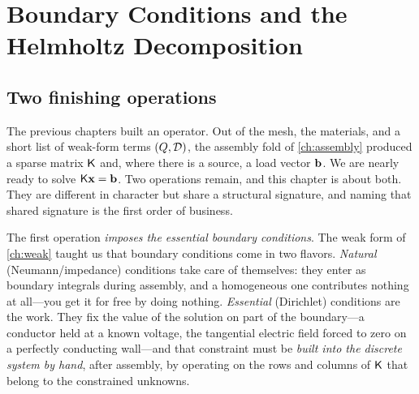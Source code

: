 \chapter{Boundary Conditions and the Helmholtz Decomposition}
\label{ch:bc}


\section{Two finishing operations}

The previous chapters built an operator. Out of the mesh, the materials, and a
short list of weak-form terms $(Q,\mathcal{D})$, the assembly fold of
\cref{ch:assembly} produced a sparse matrix $\mathsf{K}$ and, where there is a
source, a load vector $\mathbf{b}$. We are nearly ready to solve $\mathsf{K}\mathbf{x}=\mathbf{b}$. Two
operations remain, and this chapter is about both. They are different in
character but share a structural signature, and naming that shared signature is
the first order of business.

The first operation \emph{imposes the essential boundary conditions}. The weak
form of \cref{ch:weak} taught us that boundary conditions come in two flavors.
\emph{Natural} (Neumann/impedance) conditions take care of themselves: they enter
as boundary integrals during assembly, and a homogeneous one contributes nothing
at all---you get it for free by doing nothing. \emph{Essential} (Dirichlet)
conditions are the work. They fix the value of the solution on part of the
boundary---a conductor held at a known voltage, the tangential electric field
forced to zero on a perfectly conducting wall---and that constraint must be
\emph{built into the discrete system by hand}, after assembly, by operating on
the rows and columns of $\mathsf{K}$ that belong to the constrained unknowns.

